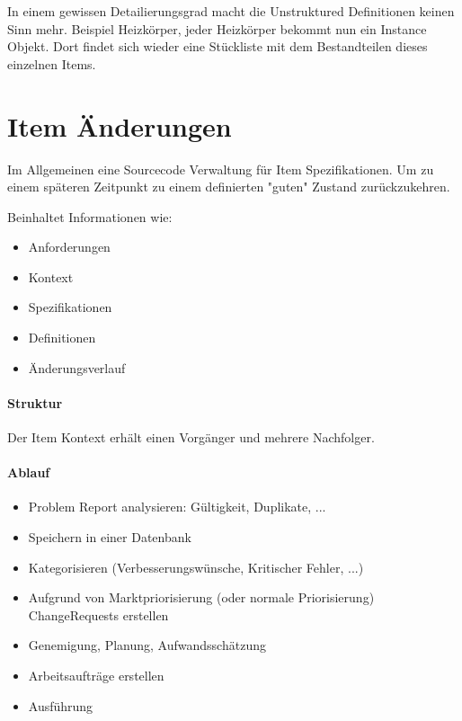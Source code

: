 
In einem gewissen Detailierungsgrad macht die Unstruktured Definitionen keinen Sinn mehr. Beispiel Heizkörper, jeder Heizkörper bekommt nun ein Instance Objekt. Dort findet sich wieder eine Stückliste mit dem Bestandteilen dieses einzelnen Items.

\newpage
\section{Item Änderungen}
Im Allgemeinen eine Sourcecode Verwaltung für Item Spezifikationen. Um zu einem späteren Zeitpunkt zu einem definierten "guten" Zustand zurückzukehren.

Beinhaltet Informationen wie:
\begin{itemize}
\item Anforderungen
\item Kontext
\item Spezifikationen
\item Definitionen
\item Änderungsverlauf
\end{itemize}

\paragraph{Struktur}
Der Item Kontext erhält einen Vorgänger und mehrere Nachfolger.


\newpage
{}

\paragraph{Ablauf}
\begin{itemize}
\item Problem Report analysieren: Gültigkeit, Duplikate, ...
\item Speichern in einer Datenbank
\item Kategorisieren (Verbesserungswünsche, Kritischer Fehler, ...)
\item Aufgrund von Marktpriorisierung (oder normale Priorisierung) ChangeRequests erstellen
\item Genemigung, Planung, Aufwandsschätzung
\item Arbeitsaufträge erstellen
\item Ausführung
\end{itemize}

